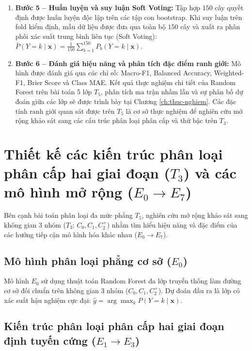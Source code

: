 \begin{enumerate}
    \item \textbf{Bước 5 -- Huấn luyện và suy luận Soft Voting:} 
    Tập hợp $150$ cây quyết định được huấn luyện độc lập trên các tập con bootstrap. Khi suy luận trên fold kiểm định, mẫu dữ liệu được đưa qua toàn bộ $150$ cây và xuất ra phân phối xác suất trung bình liên tục (Soft Voting): $\bar{P}(Y = k \mid \mathbf{x}) = \frac{1}{150}\sum_{b=1}^{150} P_b(Y = k \mid \mathbf{x})$.
    
    \item \textbf{Bước 6 -- Đánh giá hiệu năng và phân tích đặc điểm ranh giới:} 
    Mô hình được đánh giá qua các chỉ số: Macro-F1, Balanced Accuracy, Weighted-F1, Brier Score và Class MAE. Kết quả thực nghiệm chi tiết của Random Forest trên bài toán 5 lớp $T_5$, phân tích ma trận nhầm lẫn và sự phân bố dự đoán giữa các lớp sẽ được trình bày tại Chương \ref{ch:thuc-nghiem}. Các đặc tính ranh giới quan sát được trên $T_5$ là cơ sở thực nghiệm để nghiên cứu mở rộng khảo sát sang các cấu trúc phân loại phân cấp và thứ bậc trên $T_3$.
\end{enumerate}

\section{Thiết kế các kiến trúc phân loại phân cấp hai giai đoạn ($T_3$) và các mô hình mở rộng ($E_0 \to E_7$)}
\label{sec:thiet-ke-kien-truc-mo-hinh}

Bên cạnh bài toán phân loại đa mức phẳng $T_5$, nghiên cứu mở rộng khảo sát sang không gian 3 nhóm ($T_3$: $C_0, C_1, C_2^+$) nhằm tìm hiểu hiệu năng và đặc điểm của các hướng tiếp cận mô hình hóa khác nhau ($E_0 \to E_7$).

\subsection{Mô hình phân loại phẳng cơ sở ($E_0$)}
\label{subsec:e0-flat}

Mô hình $E_0$ sử dụng thuật toán Random Forest đa lớp truyền thống làm đường cơ sở đối chuẩn trên không gian 3 nhóm ($C_0, C_1, C_2^+$). Dự đoán đầu ra là lớp có xác suất hậu nghiệm cực đại: $\hat{y} = \arg\max_k P(Y=k \mid \mathbf{x})$.

\subsection{Kiến trúc phân loại phân cấp hai giai đoạn định tuyến cứng ($E_1 \to E_3$)}
\label{subsec:hard-hierarchical}


